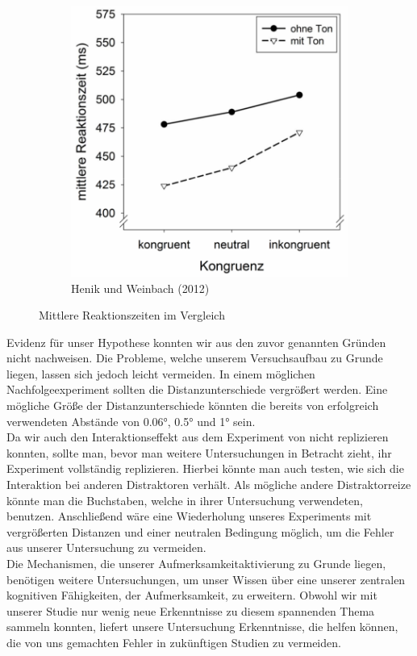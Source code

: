 \begin{figure}[t]
\begin{subfigure}[b]{0.49\textwidth}
	       \includegraphics[width=\textwidth]{grafiken/Vergleich-henik.png}
	       \caption{Henik und Weinbach (2012)}
	       \label{fig:exp2}
	    \end{subfigure}
		\caption{Mittlere Reaktionszeiten im Vergleich}
		\label{fig:vergleich} 
\end{figure}
Evidenz für unser Hypothese konnten wir aus den zuvor genannten Gründen nicht nachweisen. Die Probleme, welche unserem Versuchsaufbau zu Grunde liegen, lassen sich jedoch leicht vermeiden. In einem möglichen Nachfolgeexperiment sollten die Distanzunterschiede vergrößert werden. Eine mögliche Größe der Distanzunterschiede könnten die bereits von  erfolgreich verwendeten Abstände von 0.06°, 0.5° und 1° sein.\\
Da wir auch den Interaktionseffekt aus dem Experiment von  nicht replizieren konnten, sollte man, bevor man weitere Untersuchungen in Betracht zieht, ihr Experiment vollständig replizieren. Hierbei könnte man auch testen, wie sich die Interaktion bei anderen Distraktoren verhält. Als mögliche andere Distraktorreize könnte man die Buchstaben, welche  in ihrer Untersuchung verwendeten, benutzen. Anschließend wäre eine Wiederholung unseres Experiments mit vergrößerten Distanzen und einer neutralen Bedingung möglich, um die Fehler aus unserer Untersuchung zu vermeiden.\\
Die Mechanismen, die unserer Aufmerksamkeitaktivierung zu Grunde liegen, benötigen weitere Untersuchungen, um unser Wissen über eine unserer zentralen kognitiven Fähigkeiten, der Aufmerksamkeit, zu erweitern. Obwohl wir mit unserer Studie nur wenig neue Erkenntnisse zu diesem spannenden Thema sammeln konnten, liefert unsere Untersuchung Erkenntnisse, die helfen können, die von uns gemachten Fehler in zukünftigen Studien zu vermeiden. 
